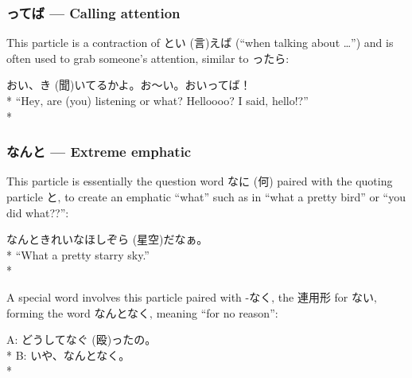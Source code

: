 \documentclass[11pt, b5paper, twoside, openright, onecolumn]{book}
\makeatletter
\newcommand*{\rubystack}[2]{{\relscale{0.5}%
  \begin{tabular}[b]{@{}c@{}}%
    {#1}\\%
   {\textscale{2}{#2}}%
  \end{tabular}}%
}
\DeclareRobustCommand*{\ruby}[2]{%
  \mbox{%
    \setlength{\parskip}{0ex}%
    \BeginAccSupp{method=pdfstringdef,ActualText={#1}}%
      \rubystack{\phantom{#2}}{#1}%
      \llap{%
        \rubystack{#2}{\phantom{#1}}%
      }%
    \EndAccSupp{}%
  }%
}
\renewcommand*{\ruby}[2]{#2 (#1)}%
\newenvironment{exampleblock}{
\setlength{\parindent}{0.6in}
\begin{minipage}[t]{\dimexpr\textwidth-\parindent}}
{\end{minipage}}
\makeatother
\begin{document}
\subsubsection{ってば — Calling attention}


This particle is a contraction of と\ruby{言}{い}えば (“when talking about …”) and is often used to grab someone’s attention‚ similar to ったら:

\vspace{0.4cm}
\begin{exampleblock}
おい、\ruby{聞}{き}いてるかよ。お～い。おいってば！ \\* 
“Hey‚ are (you) listening or what? Helloooo? I said‚ hello!?” \\* 
\end{exampleblock}
\subsubsection{なんと — Extreme emphatic}


This particle is essentially the question word \ruby{何}{なに} paired with the quoting particle と‚ to create an emphatic “what” such as in “what a pretty bird” or “you did what??”:

\vspace{0.4cm}
\begin{exampleblock}
なんときれいな\ruby{星空}{ほしぞら}だなぁ。 \\* 
“What a pretty starry sky.” \\* 
\end{exampleblock}
\vspace{0.2cm}

A special word involves this particle paired with -なく‚ the 連用形 for ない‚ forming the word なんとなく‚ meaning “for no reason”:

\vspace{0.4cm}
\begin{exampleblock}
A: どうして\ruby{殴}{なぐ}ったの。 \\* 
B: いや、なんとなく。 \\* 
\end{exampleblock}
\vspace{0.2cm}
\end{document}
